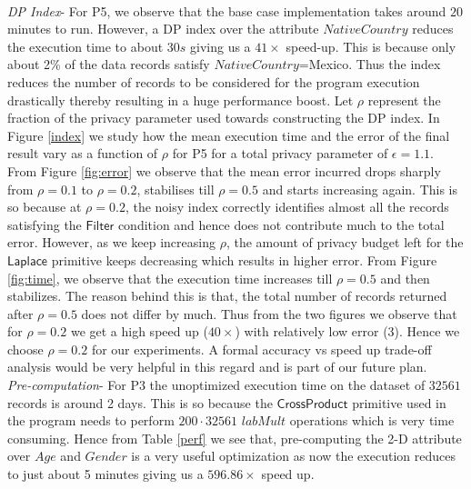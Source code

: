 \\\textit{DP Index}- For P5, we observe that the base case implementation takes around $20$ minutes to run. However,  a DP index over the attribute $NativeCountry$  reduces the execution time to about $30s$ giving us a $41\times $ speed-up. This is because only about 2\% of the data records satisfy $NativeCountry$=Mexico. Thus the index reduces the number of records to be considered for the program execution drastically thereby resulting in a huge performance boost. %
Let $\rho$ represent the fraction of the privacy parameter used towards constructing the DP index. In Figure \ref{index} we study how the mean execution time and the error of the final result vary as a function of $\rho$ for P5 for a total privacy parameter of $\epsilon=1.1$.  From Figure \ref{fig:error} we observe that the mean error incurred drops sharply from $\rho=0.1$ to $\rho=0.2$, stabilises till $\rho=0.5$ and starts increasing again. This is so because at $\rho=0.2$, the noisy index correctly identifies almost all the records satisfying the $\textsf{Filter}$ condition and hence does not contribute much to the total error. However, as we keep increasing $\rho$, the amount of privacy budget left for the $\textsf{Laplace}$ primitive keeps decreasing which results in higher error. From Figure \ref{fig:time}, we observe that the execution time increases till $\rho=0.5$ and then stabilizes. The reason behind this is that, the total number of records returned after $\rho=0.5$ does not differ by much. Thus from the two figures we observe that for $\rho=0.2$ we get a high speed up ($40\times$) with relatively low error ($3$). Hence we choose $\rho=0.2$ for our experiments. A formal accuracy vs speed up trade-off analysis would be very helpful in this regard and is part of our future plan.
 \\\textit{Pre-computation}- For P3 the unoptimized execution time on the dataset of $32561$ records is around 2 days. This is so because the $\textsf{CrossProduct}$ primitive used in the program needs to perform $200\cdot 32561$ $labMult$ operations which is very time consuming. Hence from Table \ref{perf} we see that, pre-computing the 2-D attribute over $Age$ and $Gender$ is a very useful optimization as now the execution reduces to just about 5 minutes giving us a $596.86\times$ speed up. \\ %
